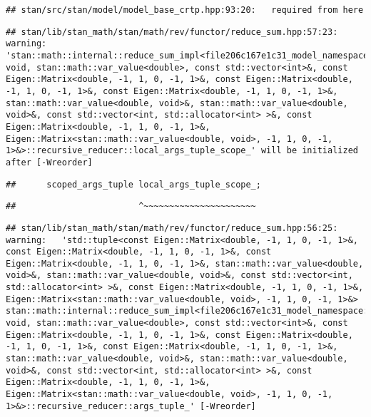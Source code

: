 \documentclass[
]{article}
\begin{document}
\begin{verbatim}
## stan/src/stan/model/model_base_crtp.hpp:93:20:   required from here
\end{verbatim}

\begin{verbatim}
## stan/lib/stan_math/stan/math/rev/functor/reduce_sum.hpp:57:23: warning: 'stan::math::internal::reduce_sum_impl<file206c167e1c31_model_namespace::partial_log_lik_rsfunctor__, void, stan::math::var_value<double>, const std::vector<int>&, const Eigen::Matrix<double, -1, 1, 0, -1, 1>&, const Eigen::Matrix<double, -1, 1, 0, -1, 1>&, const Eigen::Matrix<double, -1, 1, 0, -1, 1>&, stan::math::var_value<double, void>&, stan::math::var_value<double, void>&, const std::vector<int, std::allocator<int> >&, const Eigen::Matrix<double, -1, 1, 0, -1, 1>&, Eigen::Matrix<stan::math::var_value<double, void>, -1, 1, 0, -1, 1>&>::recursive_reducer::local_args_tuple_scope_' will be initialized after [-Wreorder]
\end{verbatim}

\begin{verbatim}
##      scoped_args_tuple local_args_tuple_scope_;
\end{verbatim}

\begin{verbatim}
##                        ^~~~~~~~~~~~~~~~~~~~~~~
\end{verbatim}

\begin{verbatim}
## stan/lib/stan_math/stan/math/rev/functor/reduce_sum.hpp:56:25: warning:   'std::tuple<const Eigen::Matrix<double, -1, 1, 0, -1, 1>&, const Eigen::Matrix<double, -1, 1, 0, -1, 1>&, const Eigen::Matrix<double, -1, 1, 0, -1, 1>&, stan::math::var_value<double, void>&, stan::math::var_value<double, void>&, const std::vector<int, std::allocator<int> >&, const Eigen::Matrix<double, -1, 1, 0, -1, 1>&, Eigen::Matrix<stan::math::var_value<double, void>, -1, 1, 0, -1, 1>&> stan::math::internal::reduce_sum_impl<file206c167e1c31_model_namespace::partial_log_lik_rsfunctor__, void, stan::math::var_value<double>, const std::vector<int>&, const Eigen::Matrix<double, -1, 1, 0, -1, 1>&, const Eigen::Matrix<double, -1, 1, 0, -1, 1>&, const Eigen::Matrix<double, -1, 1, 0, -1, 1>&, stan::math::var_value<double, void>&, stan::math::var_value<double, void>&, const std::vector<int, std::allocator<int> >&, const Eigen::Matrix<double, -1, 1, 0, -1, 1>&, Eigen::Matrix<stan::math::var_value<double, void>, -1, 1, 0, -1, 1>&>::recursive_reducer::args_tuple_' [-Wreorder]
\end{verbatim}
\end{document}
